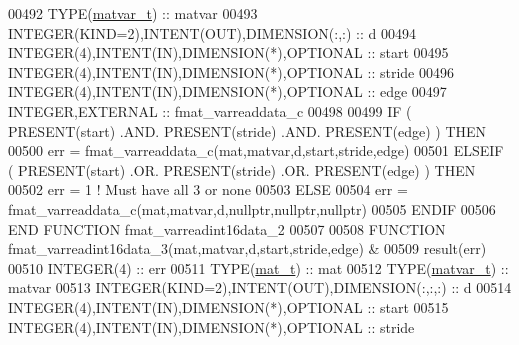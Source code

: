 \begin{DoxyCode}
00492     \textcolor{keywordtype}{TYPE}(\hyperlink{group___m_a_t_structmatvar__t}{matvar\_t})                              :: matvar
00493     \textcolor{keywordtype}{INTEGER(KIND=2)},\textcolor{keywordtype}{INTENT(OUT)},\textcolor{keywordtype}{DIMENSION(:,:)}  :: d
00494     \textcolor{keywordtype}{INTEGER(4)},\textcolor{keywordtype}{INTENT(IN)},\textcolor{keywordtype}{DIMENSION(*)},\textcolor{keywordtype}{OPTIONAL} :: start
00495     \textcolor{keywordtype}{INTEGER(4)},\textcolor{keywordtype}{INTENT(IN)},\textcolor{keywordtype}{DIMENSION(*)},\textcolor{keywordtype}{OPTIONAL} :: stride
00496     \textcolor{keywordtype}{INTEGER(4)},\textcolor{keywordtype}{INTENT(IN)},\textcolor{keywordtype}{DIMENSION(*)},\textcolor{keywordtype}{OPTIONAL} :: edge
00497     \textcolor{keywordtype}{INTEGER},\textcolor{keywordtype}{EXTERNAL}                            :: fmat\_varreaddata\_c
00498 
00499     \textcolor{keywordflow}{IF} ( \textcolor{keyword}{PRESENT}(start) .AND. \textcolor{keyword}{PRESENT}(stride) .AND. \textcolor{keyword}{PRESENT}(edge) ) \textcolor{keywordflow}{THEN}
00500         err = fmat\_varreaddata\_c(mat,matvar,d,start,stride,edge)
00501     \textcolor{keywordflow}{ELSEIF} ( \textcolor{keyword}{PRESENT}(start) .OR. \textcolor{keyword}{PRESENT}(stride) .OR. \textcolor{keyword}{PRESENT}(edge) ) \textcolor{keywordflow}{THEN}
00502         err = 1    \textcolor{comment}{! Must have all 3 or none}
00503     \textcolor{keywordflow}{ELSE}
00504         err = fmat\_varreaddata\_c(mat,matvar,d,nullptr,nullptr,nullptr)
00505 \textcolor{keywordflow}{    ENDIF}
00506 \textcolor{keyword}{END FUNCTION }fmat\_varreadint16data\_2
00507 
00508 \textcolor{keyword}{FUNCTION }fmat\_varreadint16data\_3(mat,matvar,d,start,stride,edge) &
00509                                                        result(err)
00510     \textcolor{keywordtype}{INTEGER(4)}                                   :: err
00511     \textcolor{keywordtype}{TYPE}(\hyperlink{group___m_a_t_gab0fc888f5a5d79943b16284b1f91c2e8}{mat\_t})                                  :: mat
00512     \textcolor{keywordtype}{TYPE}(\hyperlink{group___m_a_t_structmatvar__t}{matvar\_t})                               :: matvar
00513     \textcolor{keywordtype}{INTEGER(KIND=2)},\textcolor{keywordtype}{INTENT(OUT)},\textcolor{keywordtype}{DIMENSION(:,:,:)} :: d
00514     \textcolor{keywordtype}{INTEGER(4)},\textcolor{keywordtype}{INTENT(IN)},\textcolor{keywordtype}{DIMENSION(*)},\textcolor{keywordtype}{OPTIONAL}  :: start
00515     \textcolor{keywordtype}{INTEGER(4)},\textcolor{keywordtype}{INTENT(IN)},\textcolor{keywordtype}{DIMENSION(*)},\textcolor{keywordtype}{OPTIONAL}  :: stride

\end{DoxyCode}
